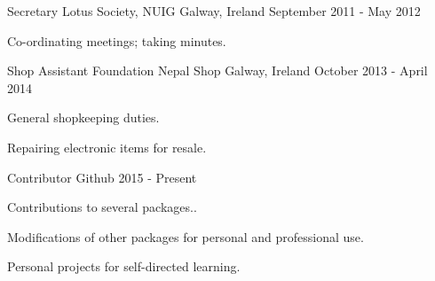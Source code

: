 


\begin{cventries}


\cventry
{Secretary} %
{Lotus Society, NUIG} %
{Galway, Ireland} %
{September 2011 - May 2012} %
{ %
\begin{cvitems}
\item {Co-ordinating meetings; taking minutes.}
\end{cvitems}
}


\cventry
{Shop Assistant} %
{Foundation Nepal Shop} %
{Galway, Ireland} %
{October 2013 - April 2014} %
{ %
\begin{cvitems}
\item {General shopkeeping duties.}
\item {Repairing electronic items for resale.}
\end{cvitems}
}

\cventry
{Contributor} %
{Github} %
{} %
{2015 - Present} %
{ %
\begin{cvitems}
\item {Contributions to several packages..}
\item {Modifications of other packages for personal and professional use.}
\item {Personal projects for self-directed learning.}
\end{cvitems}
}


\end{cventries}

